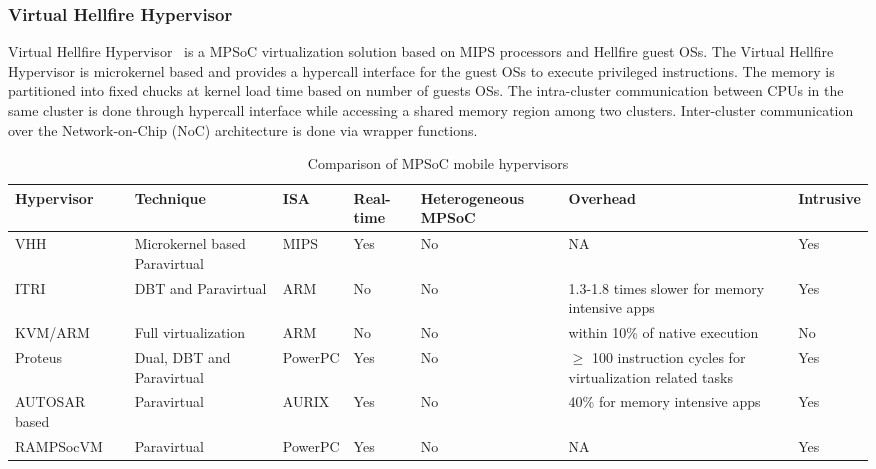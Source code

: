 \documentclass[journal, 10pt]{IEEEtran}
\begin{document}
\subsubsection{Virtual Hellfire Hypervisor}\label{sec:vhh} 
Virtual Hellfire Hypervisor~\cite{Aguiar2011a} is a MPSoC virtualization solution based on MIPS processors and Hellfire guest OSs. The Virtual Hellfire Hypervisor is microkernel based and provides a hypercall interface for the guest OSs to execute privileged instructions. The memory is partitioned into fixed chucks at kernel load time based on number of guests OSs. The intra-cluster communication between CPUs in the same cluster is done through hypercall interface while accessing a shared memory region among two clusters. Inter-cluster communication over the Network-on-Chip (NoC) architecture is done via wrapper functions. 
\begin{table*}
\centering
\caption{Comparison of MPSoC mobile hypervisors}
\label{tab:comp}    
\begin{tabular}{|m{2.6cm}|m{3.4cm}|m{1.2cm}|m{1.2cm}|m{1.8cm}|m{3.5cm}|m{1.2cm}|}
\hline
\textbf{Hypervisor} & \textbf{Technique} & \textbf{ISA} & \textbf{Real-time} & \textbf{Heterogeneous MPSoC} & \textbf{Overhead} & \textbf{Intrusive} \\
\hline
VHH~\cite{Aguiar2011a} & Microkernel based Paravirtual & MIPS & Yes & No & NA & Yes \\\hline
ITRI~\cite{Smirnov2013} & DBT and Paravirtual & ARM & No & No & 1.3-1.8 times slower for memory intensive apps & Yes \\\hline
KVM/ARM~\cite{Dall2014} & Full virtualization & ARM & No & No & within 10\% of native execution & No \\\hline
Proteus~\cite{Gilles2013} & Dual, DBT and Paravirtual & PowerPC  & Yes & No & $\geq$ 100 instruction cycles for virtualization related tasks & Yes \\\hline
AUTOSAR based~\cite{Reinhardt2014} & Paravirtual & AURIX & Yes & No & 40\% for memory intensive apps & Yes \\\hline
RAMPSocVM~\cite{Gohringer2011} & Paravirtual & PowerPC & Yes & No & NA & Yes \\\hline
\end{tabular}
\end{table*}
\end{document}
